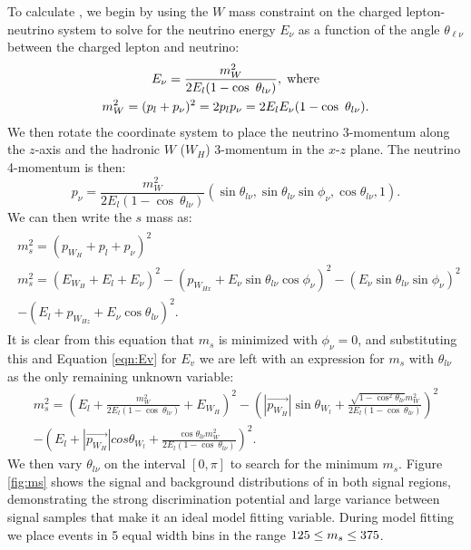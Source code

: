 To calculate \minms, we begin by using the $W$ mass constraint on the charged lepton-neutrino system to solve for the neutrino energy $E_{\nu}$ as a function of the angle $\theta_{\ell\nu}$ between the charged lepton and neutrino:
\begin{equation}
\begin{gathered}
    \label{eqn:Ev}
		E_{\nu} = \frac{m_W^2}{2E_l(1 - \cos\ \theta_{l\nu})},\;{\rm where}\\
		m_W^2 = (p_l + p_{\nu})^2 = 2p_lp_{\nu} = 2E_lE_{\nu}(1 - \cos\ \theta_{l\nu}).
	\end{gathered}
\end{equation}
We then rotate the coordinate system to place the neutrino 3-momentum along the $z$-axis and the hadronic $W$ ($W_H$) 3-momentum in the $x$-$z$ plane. The neutrino 4-momentum is then:
\begin{equation}
	p_{\nu} = \frac{m_W^2}{2E_l(1 - \cos\ \theta_{l\nu})}(\sin \theta_{l\nu}, \sin \theta_{l\nu}\sin \phi_{\nu}, \cos \theta_{l\nu}, 1).
\end{equation}
We can then write the $s$ mass as:
\begin{multline}
\label{eqn:m_s}
	\begin{gathered}
		m_s^2 = (p_{W_H} + p_l + p_{\nu})^2\\
		m_s^2 = (E_{W_H} + E_l + E_{\nu})^2 - (p_{W_{Hx}} + E_{\nu}\sin \theta_{l\nu}\cos \phi_{\nu})^2 - (E_{\nu}\sin \theta_{l\nu}\sin \phi_{\nu})^2 \\- (E_l + p_{W_{Hz}} + E_{\nu}\cos \theta_{l\nu})^2.
	\end{gathered}
\end{multline}
It is clear from this equation that $m_s$ is minimized with $\phi_{\nu} = 0$, and substituting this and Equation \ref{eqn:Ev} for $E_v$ we are left with an expression for $m_s$ with $\theta_{l\nu}$ as the only remaining unknown variable:
\begin{multline}
m_s^2 = \left(E_l + \frac{m_W^2}{2E_l(1 - \cos\ \theta_{l\nu})} + E_{W_H}\right)^2 - \left(|\vec{p_{W_H}}|\sin \theta_{W_l} + \frac{\sqrt{1 - \cos^2 \theta_{l\nu}}m_W^2}{2E_l(1 - \cos\ \theta_{l\nu})}\right)^2 \\- \left(E_l + |\vec{p_{W_H}}|cos \theta_{W_l} + \frac{\cos \theta_{l\nu}m_W^2}{2E_l(1 - \cos\ \theta_{l\nu})}\right)^2.
\end{multline}
We then vary $\theta_{l\nu}$ on the interval $[0,\pi]$ to search for the minimum $m_s$.
Figure \ref{fig:ms} shows the signal and background distributions of \minms in both signal regions, demonstrating the strong discrimination potential and large variance between signal samples that make it an ideal model fitting variable. During model fitting we place events in 5 equal width bins in the range $125 \leq m_s \leq 375$.

